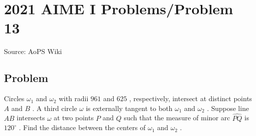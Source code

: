 \documentclass[12pt]{article}
\begin{document}
\section*{{2021 AIME I Problems/Problem 13}}
Source: AoPS Wiki

\subsection*{Problem}
Circles $\omega_1$ and $\omega_2$ with radii $961$ and $625$ , respectively, intersect at distinct points $A$ and $B$ . A third circle $\omega$ is externally tangent to both $\omega_1$ and $\omega_2$ . Suppose line $AB$ intersects $\omega$ at two points $P$ and $Q$ such that the measure of minor arc $\widehat{PQ}$ is $120^{\circ}$ . Find the distance between the centers of $\omega_1$ and $\omega_2$ .
\end{document}
